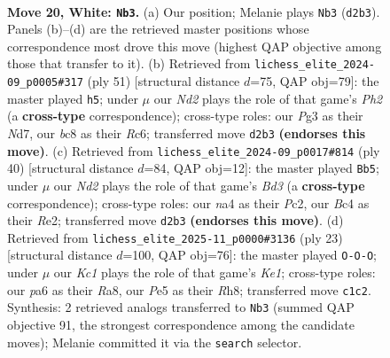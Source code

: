 \documentclass[11pt]{article}
\begin{document}
\clearpage

\begin{figure}[p]\centering
\begin{subfigure}{0.46\textwidth}\centering
\resizebox{\linewidth}{!}{%
\newchessgame
\chessboard[
  setfen={1rb2b1r/5k1p/ppn1p1p1/4Pp2/n1B2B2/5NP1/PP1N1P1P/R1K3R1 w - - 0 20},
  showmover=false,
  pgfstyle=straightmove, color=movearrow, markmove={d2-b3}
]}
\caption{}
\end{subfigure}\hfill
\begin{subfigure}{0.46\textwidth}\centering
\resizebox{\linewidth}{!}{%
\newchessgame
\chessboard[
  setfen={r5k1/3n3p/2r1pn2/p2b1pp1/2pP4/B3PP2/P1R1B1PP/R3N1K1 b - - 0 26},
  showmover=false,
  pgfstyle=straightmove, color=movearrow, markmove={h7-h5}
]}
\caption{}
\end{subfigure}
\\[4pt]
\begin{subfigure}{0.46\textwidth}\centering
\resizebox{\linewidth}{!}{%
\newchessgame
\chessboard[
  setfen={2r1r1k1/1b1n1ppp/1p6/p1bp4/3Nn3/PP1B1NPP/1BP1RP2/R5K1 w - - 7 21},
  showmover=false,
  pgfstyle=straightmove, color=movearrow, markmove={d3-b5}
]}
\caption{}
\end{subfigure}\hfill
\begin{subfigure}{0.46\textwidth}\centering
\resizebox{\linewidth}{!}{%
\newchessgame
\chessboard[
  setfen={r3k2r/ppp1b1pp/2n1bn2/5p2/2P1p3/1PN3P1/PB2PPBP/R3NRK1 b kq - 2 12},
  showmover=false,
  pgfstyle=straightmove, color=movearrow, markmove={e8-c8}
]}
\caption{}
\end{subfigure}
\caption{\textbf{Move 20, White: \texttt{Nb3}.} (a) Our position; Melanie plays \texttt{Nb3} (\texttt{d2b3}). Panels (b)--(d) are the retrieved master positions whose correspondence most drove this move (highest QAP objective among those that transfer to it). (b) Retrieved from \texttt{lichess\_elite\_2024-09\_p0005\#317} (ply 51) [structural distance $d$=75, QAP obj=79]: the master played \texttt{h5}; under $\mu$ our \emph{Nd2} plays the role of that game's \emph{Ph2} (a \textbf{cross-type} correspondence); cross-type roles: our \emph{P}g3 as their \emph{N}d7, our \emph{b}c8 as their \emph{R}c6; transferred move \texttt{d2b3} \textbf{(endorses this move)}. (c) Retrieved from \texttt{lichess\_elite\_2024-09\_p0017\#814} (ply 40) [structural distance $d$=84, QAP obj=12]: the master played \texttt{Bb5}; under $\mu$ our \emph{Nd2} plays the role of that game's \emph{Bd3} (a \textbf{cross-type} correspondence); cross-type roles: our \emph{n}a4 as their \emph{P}c2, our \emph{B}c4 as their \emph{R}e2; transferred move \texttt{d2b3} \textbf{(endorses this move)}. (d) Retrieved from \texttt{lichess\_elite\_2025-11\_p0000\#3136} (ply 23) [structural distance $d$=100, QAP obj=76]: the master played \texttt{O-O-O}; under $\mu$ our \emph{Kc1} plays the role of that game's \emph{Ke1}; cross-type roles: our \emph{p}a6 as their \emph{R}a8, our \emph{P}e5 as their \emph{R}h8; transferred move \texttt{c1c2}. Synthesis: 2 retrieved analogs transferred to \texttt{Nb3} (summed QAP objective 91, the strongest correspondence among the candidate moves); Melanie committed it via the \texttt{search} selector.}
\label{fig:thought-m38}
\end{figure}
\end{document}
